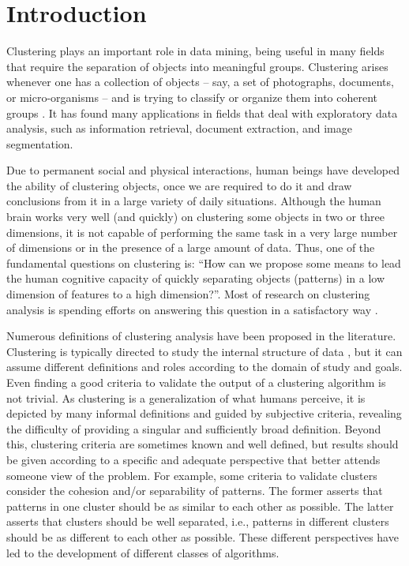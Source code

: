\chapter{Introduction}
Clustering plays an important role in data mining, being useful in many fields that require the separation of objects into meaningful groups. Clustering arises whenever one has a collection of objects -- say, a set of photographs, documents, or micro-organisms -- and is trying to classify or organize them into coherent groups \cite{tardos}. It has found many applications in fields that deal with exploratory data analysis, such as information retrieval, document extraction, and image segmentation.

Due to permanent social and physical interactions, human beings have developed the ability of clustering objects, once we are required to do it and draw conclusions from it in a large variety of daily situations. Although the human brain works very well (and quickly) on clustering some objects in two or three dimensions, it is not capable of performing the same task in a very large number of dimensions or in the presence of a large amount of data. Thus, one of the fundamental questions on clustering is: ``How can we propose some means to lead the human cognitive capacity of quickly separating objects (patterns) in a low dimension of features to a high dimension?''. Most of research on clustering analysis is spending efforts on answering this question in a satisfactory way \cite{Das2009}.

Numerous definitions of clustering analysis have been proposed in the literature. Clustering is typically directed to study the internal structure of data \cite{Karkkainen2006}, but it can assume different definitions and roles according to the domain of study and goals. Even finding a good criteria to validate the output of a clustering algorithm is not trivial. As clustering is a generalization of what humans perceive, it is depicted by many informal definitions and guided by subjective criteria, revealing the difficulty of providing a singular and sufficiently broad definition. Beyond this, clustering criteria are sometimes known and well defined, but results should be given according to a specific and adequate perspective that better attends someone view of the problem. For example, some criteria to validate clusters consider the cohesion and/or separability of patterns. The former asserts that patterns in one cluster should be as similar to each other as possible. The latter asserts that clusters should be well separated, i.e., patterns in different clusters should be as different to each other as possible. These different perspectives have led to the development of different classes of algorithms.

